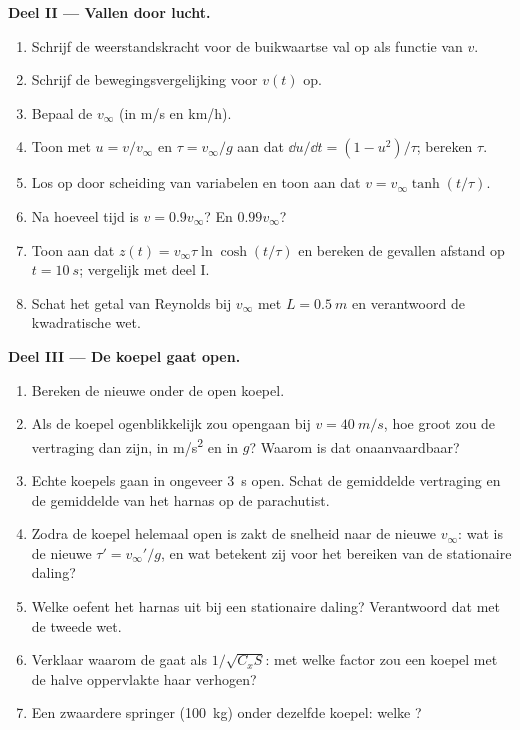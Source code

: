 \begin{problem}
\medskip
\noindent\textbf{Deel II --- Vallen door lucht.}
\begin{enumerate}[resume]
  \item Schrijf de weerstandskracht voor de buikwaartse val op als functie van $v$.
  \item Schrijf de bewegingsvergelijking voor $v(t)$ op.
  \item Bepaal de  $v_\infty$ (in \unit{m/s} en
        \unit{km/h}).
  \item Toon met $u = v/v_\infty$ en $\tau = v_\infty/g$ aan dat
        $\dd u/\dd t = (1 - u^2)/\tau$; bereken $\tau$.
  \item Los op door scheiding van variabelen en toon aan dat
        $v = v_\infty\tanh(t/\tau)$.
  \item Na hoeveel tijd is $v = 0.9v_\infty$? En $0.99v_\infty$?
  \item Toon aan dat $z(t) = v_\infty\tau\ln\cosh(t/\tau)$ en bereken de
        gevallen afstand op $t = \qty{10}{s}$; vergelijk met deel I.
  \item Schat het getal van Reynolds bij $v_\infty$ met $L = \qty{0.5}{m}$
        en verantwoord de kwadratische wet.
\end{enumerate}

\medskip
\noindent\textbf{Deel III --- De koepel gaat open.}
\begin{enumerate}[resume]
  \item Bereken de nieuwe  onder de open koepel.
  \item Als de koepel ogenblikkelijk zou opengaan bij $v = \qty{40}{m/s}$, hoe
        groot zou de vertraging dan zijn, in \unit{m/s^2} en in $g$? Waarom is
        dat onaanvaardbaar?
  \item Echte koepels gaan in ongeveer \qty{3}{s} open. Schat de gemiddelde
        vertraging en de gemiddelde  van het harnas op de
        parachutist.
  \item Zodra de koepel helemaal open is zakt de snelheid naar de nieuwe
        $v_\infty$: wat is de nieuwe  $\tau' = v_\infty'/g$,
        en wat betekent zij voor het bereiken van de stationaire daling?
  \item Welke  oefent het harnas uit bij een stationaire daling? Verantwoord dat met de
        tweede wet.
  \item Verklaar waarom de  gaat als $1/\sqrt{C_xS}$: met welke
        factor zou een koepel met de halve oppervlakte haar verhogen?
  \item Een zwaardere springer (\qty{100}{kg}) onder dezelfde koepel: welke
        ?
\end{enumerate}


\end{problem}
